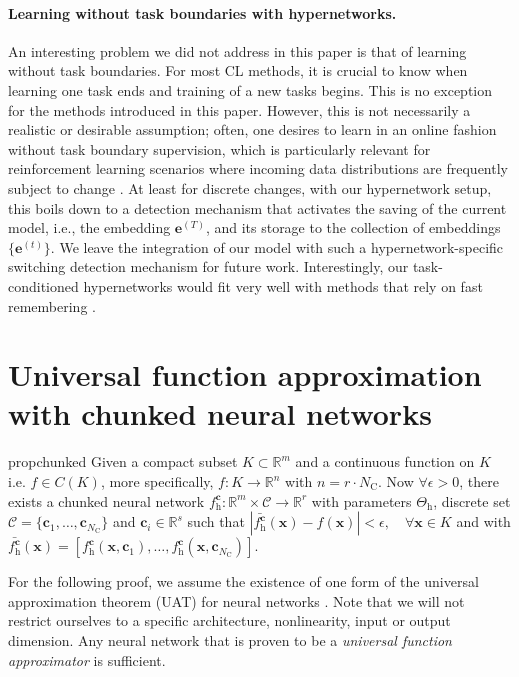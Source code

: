 \documentclass{article}
\begin{document}
\paragraph{Learning without task boundaries with hypernetworks.} An interesting problem we did not address in this paper is that of learning without task boundaries. For most CL methods, it is crucial to know when learning one task ends and training of a new tasks begins. This is no exception for the methods introduced in this paper. However, this is not necessarily a realistic or desirable assumption; often, one desires to learn in an online fashion without task boundary supervision, which is particularly relevant for reinforcement learning scenarios where incoming data distributions are frequently subject to change \citep{rolnick2018experience}. At least for discrete changes, with our hypernetwork setup, this boils down to a detection mechanism that activates the saving of the current model, i.e., the embedding $\mathbf{e}^{(T)}$, and its storage to the collection of embeddings $\{ \mathbf{e}^{(t)}\}$. We leave the integration of our model with such a hypernetwork-specific switching detection mechanism for future work. Interestingly, our task-conditioned hypernetworks would fit very well with methods that rely on fast remembering \citep[a recently proposed approach which appeared in parallel to our paper,][]{he2019task}.


\section{Universal function approximation with chunked neural networks}
\label{apx:proof-chunks}

\begin{restatable}{prop}{chunked}
  \label{theoremchunks}
  Given a compact subset $K \subset \mathbb{R}^m $ and a continuous function on $K$ i.e. $f \in C(K)$, more specifically, $f: K \to \mathbb{R}^n$ with $n = r \cdot N_\text{C}$. Now $\forall \epsilon > 0$, there exists a chunked neural network $f^{\mathbf{c}}_\mathrm{h} : \mathbb{R}^m \times \mathcal{C} \to \mathbb{R}^r$ with parameters $\Theta_\mathrm{h}$, discrete set $\mathcal{C} = \{\mathbf{c}_1, \dots, \mathbf{c}_{N_\text{C}}\}$ and $\mathbf{c}_i \in \mathbb{R}^s$ such that $|\bar{f^{\mathbf{c}}_\mathrm{h}}(\mathbf{x}) - f(\mathbf{x})| < \epsilon, \quad \forall \mathbf{x} \in K$ and with $\bar{f^{\mathbf{c}}_\mathrm{h}}(\mathbf{x}) = [f^{\mathbf{c}}_\mathrm{h}(\mathbf{x}, \mathbf{c}_1), \dots, f^{\mathbf{c}}_\mathrm{h}(\mathbf{x}, \mathbf{c}_{N_\text{C}})]$.
\end{restatable}
For the following proof, we assume the existence of one form of the universal approximation theorem (UAT) for neural networks \citep{leshno_multilayer_1993,hanin_universal_2017}.
Note that we will not restrict ourselves to a specific architecture, nonlinearity, input or output dimension. Any neural network that is proven to be a \textit{universal function approximator} is sufficient. 
\end{document}
